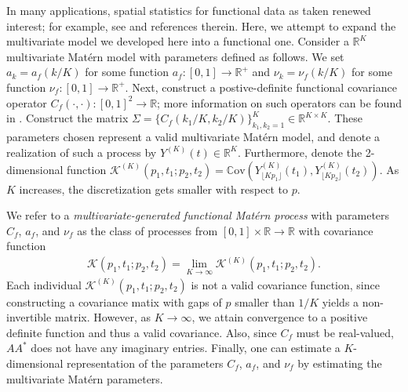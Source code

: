 \documentclass[11pt]{article}
\begin{document}
In many applications, spatial statistics for functional data as taken renewed interest; for example, see \cite{martinez-hernadez_recent_2020} and references therein. Here, we attempt to expand the multivariate model we developed here into a functional one. Consider a $\mathbb{R}^K$ multivariate Mat\'ern model with parameters defined as follows. We set $a_{k} = a_f(k/K)$ for some function $a_f : [0,1] \to \mathbb{R}^+$ and $\nu_k = \nu_f(k/K)$ for some function $\nu_f: [0,1] \to \mathbb{R}^+$. Next, construct a postive-definite functional covariance operator $C_f(\cdot,\cdot): [0,1]^2 \to \mathbb{R}$; more information on such operators can be found in \cite{hsing_theoretical_2015}. Construct the matrix $\Sigma = \{C_f(k_1/K, k_2/K)\}_{k_1, k_2 = 1}^K \in \mathbb{R}^{K\times K}$.
These parameters chosen represent a valid multivariate Mat\'ern model, and denote a realization of such a process by $Y^{(K)}(t) \in \mathbb{R}^K$. 
Furthermore, denote the 2-dimensional function $\mathcal{K}^{(K)}(p_1,t_1;p_2,t_2) = \mathbb{C}\textrm{ov}( Y^{(K)}_{\lfloor Kp_1\rfloor}(t_1), Y^{(K)}_{\lfloor Kp_2\rfloor}(t_2))$. As $K$ increases, the discretization gets smaller with respect to $p$. 

We refer to a \textit{multivariate-generated functional Mat\'ern process} with parameters $C_f$, $a_f$, and $\nu_f$ as the class of processes from $[0,1] \times \mathbb{R} \to \mathbb{R}$ with covariance function \begin{align*}
\mathcal{K}(p_1,t_1;p_2,t_2)=\lim_{K\to \infty} \mathcal{K}^{(K)}(p_1,t_1;p_2,t_2).
\end{align*}
Each individual $\mathcal{K}^{(K)}(p_1,t_1;p_2,t_2)$ is not a valid covariance function, since constructing a covariance matix with gaps of $p$ smaller than $1/K$ yields a non-invertible matrix. However, as $K \to \infty$, we attain convergence to a positive definite function and thus a valid covariance. Also, since $C_f$ must be real-valued, $AA^*$ does not have any imaginary entries. Finally, one can estimate a $K$-dimensional representation of the parameters $C_f$, $a_f$, and $\nu_f$ by estimating the multivariate Mat\'ern parameters.

\end{document}
